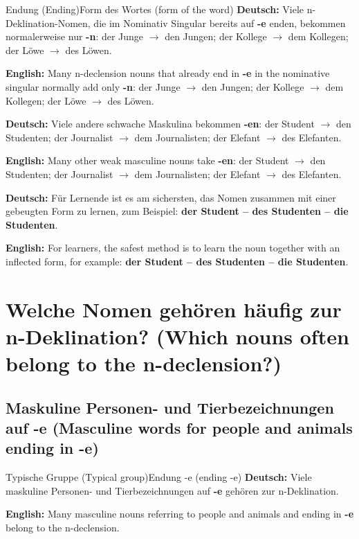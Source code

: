 \documentclass[a4paper,11pt]{article}
\newcommand{\GermanText}[1]{\textbf{Deutsch: }#1\par}
\newcommand{\EnglishText}[1]{{\small\color{SoftGray}\textbf{English: }#1\par}}
\begin{document}
        \begin{grammarentry}{Endung \textnormal{(Ending)}}{Form des Wortes \textnormal{(form of the word)}}
            \GermanText{Viele n-Deklination-Nomen, die im Nominativ Singular bereits auf \textbf{-e} enden, bekommen normalerweise nur \textbf{-n}: der Junge $\rightarrow$ den Jungen; der Kollege $\rightarrow$ dem Kollegen; der Löwe $\rightarrow$ des Löwen.}
            \EnglishText{Many n-declension nouns that already end in \textbf{-e} in the nominative singular normally add only \textbf{-n}: der Junge $\rightarrow$ den Jungen; der Kollege $\rightarrow$ dem Kollegen; der Löwe $\rightarrow$ des Löwen.}

            \GermanText{Viele andere schwache Maskulina bekommen \textbf{-en}: der Student $\rightarrow$ den Studenten; der Journalist $\rightarrow$ dem Journalisten; der Elefant $\rightarrow$ des Elefanten.}
            \EnglishText{Many other weak masculine nouns take \textbf{-en}: der Student $\rightarrow$ den Studenten; der Journalist $\rightarrow$ dem Journalisten; der Elefant $\rightarrow$ des Elefanten.}

            \GermanText{Für Lernende ist es am sichersten, das Nomen zusammen mit einer gebeugten Form zu lernen, zum Beispiel: \textbf{der Student -- des Studenten -- die Studenten}.}
            \EnglishText{For learners, the safest method is to learn the noun together with an inflected form, for example: \textbf{der Student -- des Studenten -- die Studenten}.}
        \end{grammarentry}

    \section{Welche Nomen gehören häufig zur n-Deklination? \textnormal{(Which nouns often belong to the n-declension?)}}

        \subsection{Maskuline Personen- und Tierbezeichnungen auf -e \textnormal{(Masculine words for people and animals ending in -e)}}

            \begin{grammarentry}{Typische Gruppe \textnormal{(Typical group)}}{Endung -e \textnormal{(ending -e)}}
                \GermanText{Viele maskuline Personen- und Tierbezeichnungen auf \textbf{-e} gehören zur n-Deklination.}
                \EnglishText{Many masculine nouns referring to people and animals and ending in \textbf{-e} belong to the n-declension.}
            \end{grammarentry}
\end{document}
